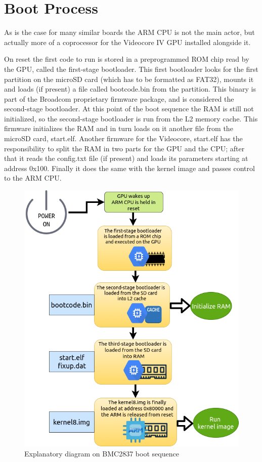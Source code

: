 \documentclass[12pt,a4paper,openright,twoside]{report}
\begin{document}
\section{Boot Process}
As is the case for many similar boards the ARM CPU is not the main
actor, but actually more of a coprocessor for the Videocore IV GPU installed
alongside it.

On reset the first code to run is stored in a preprogrammed ROM chip read by the GPU,
called the first-stage bootloader. This first bootloader looks for the first
partition on the microSD card (which has to be formatted as FAT32), mounts
it and loads (if present) a file called bootcode.bin from the partition.
This binary is part of the Broadcom proprietary firmware package, and is considered
the second-stage bootloader.
At this point of the boot sequence the RAM is still not initialized, so the second-stage
bootloader is run from the L2 memory cache. This firmware initializes the RAM 
and in turn loads on it another file from the microSD card, start.elf.
Another firmware for the Videocore, start.elf has the responsibility to split 
the RAM in two parts for the GPU and the CPU; after that it reads the config.txt 
file (if present) and loads its parameters starting at address 0x100.
 Finally it does the same with the kernel image and passes control to the ARM CPU.

 \begin{figure}[t]
 \includegraphics[scale=0.6234]{tesi1.png}
 \caption[Figure 1]{Explanatory diagram on BMC2837 boot sequence}\label{fig:prima}
 \end{figure}
 \clearpage
\end{document}
